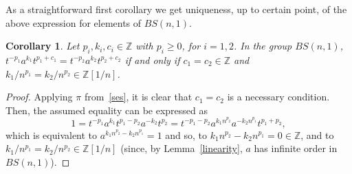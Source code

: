 \documentclass[english]{amsart}
\newtheorem{cor}[thm]{Corollary}
\theoremstyle{definition}
\newcommand\ZZ{\mathbb{Z}}
\newcommand{\R}[1]{{\color{red} #1}}
\begin{document}
As a straightforward first corollary we get uniqueness, up to certain point, of the above expression for elements of $BS(n,1)$. 


\begin{cor}
Let $p_i, k_i, c_i\in \ZZ$ with $p_i\geq 0$, for $i=1,2$. In the group $BS(n,1)$, $t^{-p_1}a^{k_1} t^{p_1+c_1}=t^{-p_2}a^{k_2} t^{p_2+c_2}$ if and only if $c_1 =c_2 \in \ZZ$ and $k_1/n^{p_1}=k_2/n^{p_2}\in \ZZ[1/n]$.
\end{cor}

\begin{proof}
Applying $\pi$ from~\eqref{ses}, it is clear that $c_1 =c_2$ is a necessary condition. Then, the assumed equality can be expressed as 
 $$
1=t^{-p_1}a^{k_1} t^{p_1-p_2} a^{-k_2} t^{p_2} = t^{-p_1-p_2}a^{k_1 n^{p_2}} a^{-k_2n^{p_1}} t^{p_1+p_2},
 $$
which is equivalent to $a^{k_1 n^{p_2} -k_2n^{p_1}}=1$ and so, to $k_1 n^{p_2} -k_2n^{p_1}=0\in \ZZ$, and to $k_1/n^{p_1}=k_2/n^{p_2}\in \ZZ[1/n]$ (since, by Lemma~\ref{linearity}, $a$ has infinite order in $BS(n,1)$).
\end{proof}
\end{document}
